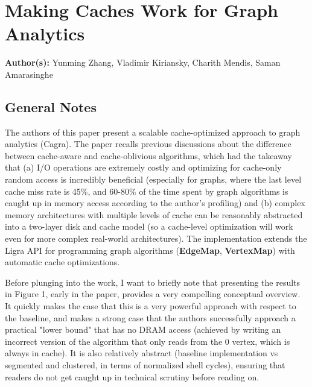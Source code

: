 \section{Making Caches Work for Graph Analytics}

\textbf{Author(s):} Yunming Zhang, Vladimir Kiriansky, Charith Mendis, Saman Amarasinghe

\subsection{General Notes}

The authors of this paper present a scalable cache-optimized approach to graph analytics (Cagra). The paper recalls previous discussions about the difference between cache-aware and cache-oblivious algorithms, which had the takeaway that (a) I/O operations are extremely costly and optimizing for cache-only random access is incredibly beneficial (especially for graphs, where the last level cache miss rate is 45\%, and 60-80\% of the time spent by graph algorithms is caught up in memory access according to the author's profiling) and (b) complex memory architectures with multiple levels of cache can be reasonably abstracted into a two-layer disk and cache model (so a cache-level optimization will work even for more complex real-world architectures). The implementation extends the Ligra API for programming graph algorithms (\textbf{EdgeMap}, \textbf{VertexMap}) with automatic cache optimizations.

Before plunging into the work, I want to briefly note that presenting the results in Figure 1, early in the paper, provides a very compelling conceptual overview. It quickly makes the case that this is a very powerful approach with respect to the baseline, and makes a strong case that the authors successfully approach a practical "lower bound" that has no DRAM access (achieved by writing an incorrect version of the algorithm that only reads from the 0 vertex, which is always in cache). It is also relatively abstract (baseline implementation vs segmented and clustered, in terms of normalized shell cycles), ensuring that readers do not get caught up in technical scrutiny before reading on.

